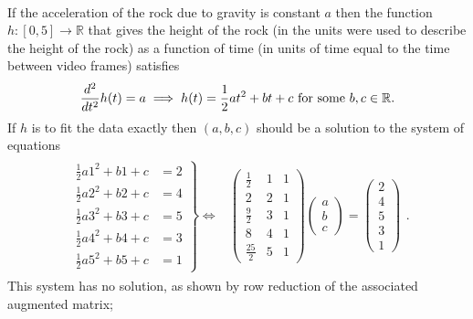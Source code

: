 \documentclass[12pt]{article}
\def\R{{\mathbb{R}}}
\def\b{\beta}
\def\bea{\begin{align}}
\def\eea{\end{align}}
\def\nn{\nonumber}
\def\bv{\left(\begin{array}{c}}
\def\ev{\end{array}\right) }
\def\LR{\Leftrightarrow}
\begin{document}
\\
If the acceleration of the rock due to gravity is constant $a$ then the function $h:[0,5]\to \R$ that gives the height of the rock (in the units were used to describe the height of the rock) as a function of time (in units of time equal to the time between video frames) satisfies 
\[ \frac{d^2}{dt^2} h(t)=a \implies h(t)=\frac12 a t^2+bt+c {\rm ~for~some ~}b,c\in \R.\]
If $h$ is to fit the data exactly then $(a,b,c)$ should be a solution to the system of equations 
\bea \nn
\begin{array}{cc}
\left.
\begin{array}{cc}
\frac12a 1^2+b1+c &= 2 \\
\frac12a 2^2+b2+c &= 4 \\
\frac12a 3^2+b3+c &= 5 \\
\frac12a 4^2+b4+c &= 3 \\
\frac12a 5^2+b5+c &= 1 
\end{array}
\right\}\LR
& 
\begin{pmatrix}
\frac12 &1&1\\
2&2&1\\
\frac92 &3&1\\
8&4&1\\
\frac{25}{2} &5&1
\end{pmatrix}
\bv a\\b\\c \ev = \bv 2\\4\\5\\3\\1\ev
\end{array}.
\eea
This system has no solution, as shown by row reduction of the associated augmented matrix; 
\end{document}
